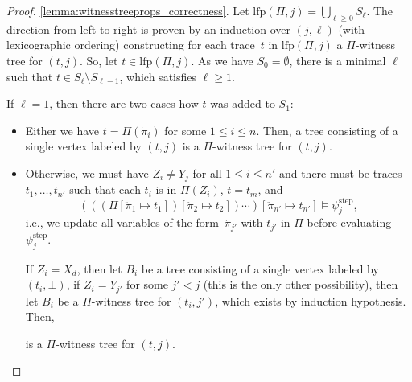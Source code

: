 \documentclass[dvipsnames,10pt,a4paper]{amsart}
\theoremstyle{definition}
\theoremstyle{remark}
\newcommand{\unidisvar}{X_d}
\newcommand{\step}{\mathrm{step}}
\newcommand{\overdot}[1]{\dot{#1}}
\newcommand{\overdotdot}[1]{\ddot{#1}}
\newcommand{\lfp}{\mathrm{lfp}}
\newcommand{\tree}{B}
\begin{document}
\begin{proof}
\ref{lemma:witnesstreeprops_correctness}. 
Let $\lfp(\Pi, j) = \bigcup_{\ell \ge 0} S_\ell$. The direction from left to right is proven by an induction over $(j,\ell)$ (with lexicographic ordering) constructing for each trace~$t$ in $\lfp(\Pi,j)$ a $\Pi$-witness tree for $(t,j)$.
So, let $t \in \lfp(\Pi, j)$. As we have $S_0 = \emptyset$, there is a minimal $\ell$ such that $t \in S_\ell \setminus S_{\ell-1}$, which satisfies $\ell \ge 1$.

If $\ell = 1$, then there are two cases how $t$ was added to $S_1$:
\begin{itemize}
    \item Either we have $t = \Pi(\overdot{\pi}_i)$ for some $1 \le i \le n$. Then, a tree consisting of a single vertex labeled by $(t,j)$ is a $\Pi$-witness tree for $(t,j)$.
    \item Otherwise, we must have $Z_i \neq Y_j$ for all $1 \le i \le n'$ and there must be traces~$t_1, \ldots, t_{n'}$ such that each $t_i$ is in $\Pi(Z_i)$, $t = t_m$, and 
    \[
    (((\Pi[\overdotdot{\pi}_1 \mapsto t_1])[\overdotdot{\pi}_2 \mapsto t_2]) \cdots )[\overdotdot{\pi}_{n'} \mapsto t_{n'}]
    \models \psi_j^\step,\]
    i.e., we update all variables of the form~$\overdotdot{\pi}_{j'}$ with $t_{j'}$ in $\Pi$ before evaluating $\psi_j^\step$.
    
    If $Z_i = \unidisvar$, then let $\tree_i$ be a tree consisting of a single vertex labeled by $(t_i,\bot)$,
    if $Z_i = Y_{j'}$ for some $j' < j$ (this is the only other possibility), then let $\tree_i$ be a $\Pi$-witness tree for $(t_i,j')$, which exists by induction hypothesis.
    Then,
\begin{center}
\end{center}
    is a $\Pi$-witness tree for $(t,j)$.
\end{itemize}


\end{proof}
\end{document}
